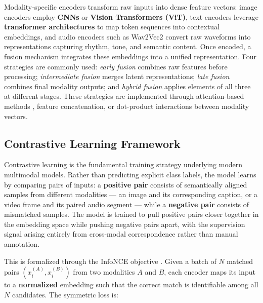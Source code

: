 \documentclass[12pt,a4paper,oneside,english]{book}
\begin{document}
Modality-specific encoders transform raw inputs into dense feature vectors: image encoders employ \textbf{CNNs} or \textbf{Vision Transformers (ViT)}, text encoders leverage \textbf{transformer architectures} to map token sequences into contextual embeddings, and audio encoders such as Wav2Vec2 \citep{baevski2020wav2vec20frameworkselfsupervised} convert raw waveforms into representations capturing rhythm, tone,
and semantic content. Once encoded, a fusion mechanism integrates these embeddings into a unified representation. Four strategies are commonly used: 
\textit{early fusion} combines raw features before processing; \textit{intermediate fusion} merges latent representations; \textit{late fusion} combines final modality outputs; and \textit{hybrid fusion} applies elements of all three at different stages. These
strategies are implemented through attention-based methods \cite{vaswani2017attention}, feature concatenation, or dot-product interactions between modality vectors.

\subsection{Contrastive Learning Framework}
\label{subsec:contrastive_learning}
Contrastive learning is the fundamental training strategy underlying modern multimodal models. Rather than predicting explicit class labels, the model learns by comparing pairs of inputs: a \textbf{positive pair} consists of semantically aligned samples from different modalities --- an image and its corresponding caption, or a video frame and its paired audio segment --- while a \textbf{negative pair} consists of mismatched samples.
The model is trained to pull positive pairs closer together in the embedding space while pushing negative pairs apart, with the supervision signal arising entirely from cross-modal correspondence rather than manual annotation.

This is formalized through the InfoNCE objective \citep{oord2019representationlearningcontrastivepredictive}. Given a batch of $N$ matched pairs $(x_i^{(A)}, x_i^{(B)})$ from two modalities $A$ and $B$, each encoder maps its input to a \textbf{normalized} embedding such that the correct match is identifiable among all $N$ candidates. The symmetric loss is:
\end{document}
